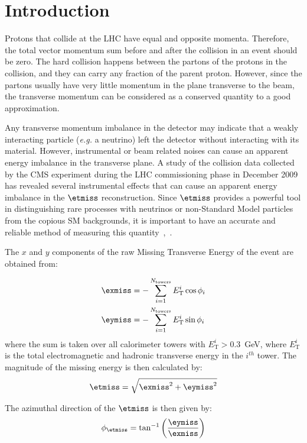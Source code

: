 \section{Introduction}
Protons that collide at the LHC have equal and
opposite momenta. Therefore, the total vector momentum sum before and
after the collision in an event
should be zero. The hard collision happens between the partons of the
protons in the collision, and they can carry any fraction of the parent
proton. However, since the partons usually have very
little momentum in the plane transverse to the beam, the transverse
momentum can be considered as a conserved quantity to a good
approximation. 

Any transverse momentum imbalance in the detector may indicate that a
weakly interacting particle (\textit{e.g.} a neutrino) left the
detector without interacting with its material. However, instrumental or
beam related noises can cause an apparent energy imbalance in the
transverse plane. A study of the collision data collected by the CMS
experiment during the LHC commissioning phase in December 2009 has
revealed several instrumental effects that can cause an apparent energy
imbalance in the $\etmiss$ reconstruction. Since $\etmiss$ provides a powerful
tool in distinguishing rare processes with neutrinos or non-Standard
Model particles from the copious SM backgrounds, it is important to have an accurate and reliable method
of measuring this quantity~\cite{CMS:AN_2007_041},~\cite{CMS:AN_2008_089}. 

The $x$ and $y$ components of the raw Missing Transverse Energy of the
event are obtained from:

\begin{align}
  \label{eq:32}
  \exmiss&=-\sum^{N_\text{towers}}_{i=1}E_\text{T}^i\cos\phi_i\\
  \label{eq:33}
  \eymiss&=-\sum^{N_\text{towers}}_{i=1}E_\text{T}^i\sin\phi_i
\end{align}
where the sum is taken over all calorimeter towers with $E_\text{T}^i>0.3$~GeV, 
where $E_\text{T}^i$ is the total electromagnetic and hadronic transverse energy 
in the $i^{th}$ tower. The magnitude of the missing energy is then calculated
by:
\begin{equation}
  \etmiss=\sqrt{\exmiss^2+\eymiss^2}
\end{equation}

The azimuthal direction of the $\etmiss$ is then given by:
\begin{equation}
  \phi_{\etmiss}=\tan^{-1}\left(\frac{\eymiss}{\exmiss}\right)
\end{equation}

